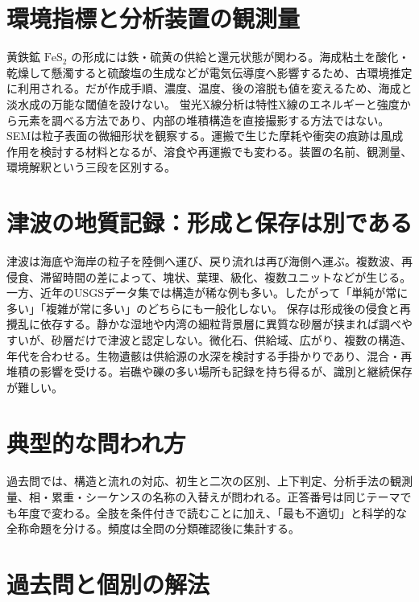 \section{環境指標と分析装置の観測量}
\label{theory:sediment:proxy}
黄鉄鉱 \(\mathrm{FeS_2}\) の形成には鉄・硫黄の供給と還元状態が関わる。海成粘土を酸化・乾燥して懸濁すると硫酸塩の生成などが電気伝導度へ影響するため、古環境推定に利用される。だが作成手順、濃度、温度、後の溶脱も値を変えるため、海成と淡水成の万能な閾値を設けない。\cite{sed_gsj_ec2011}
蛍光X線分析は特性X線のエネルギーと強度から元素を調べる方法であり、内部の堆積構造を直接撮影する方法ではない。SEMは粒子表面の微細形状を観察する。運搬で生じた摩耗や衝突の痕跡は風成作用を検討する材料となるが、溶食や再運搬でも変わる。装置の名前、観測量、環境解釈という三段を区別する。\cite{sed_xrf_jaea,sed_sem_shimane}

\section{津波の地質記録：形成と保存は別である}
\label{theory:sediment:tsunami}
津波は海底や海岸の粒子を陸側へ運び、戻り流れは再び海側へ運ぶ。複数波、再侵食、滞留時間の差によって、塊状、葉理、級化、複数ユニットなどが生じる。一方、近年のUSGSデータ集では構造が稀な例も多い。したがって「単純が常に多い」「複雑が常に多い」のどちらにも一般化しない。\cite{sed_tsunami_fujino,sed_tsunami_usgs}
保存は形成後の侵食と再攪乱に依存する。静かな湿地や内湾の細粒背景層に異質な砂層が挟まれば調べやすいが、砂層だけで津波と認定しない。微化石、供給域、広がり、複数の構造、年代を合わせる。生物遺骸は供給源の水深を検討する手掛かりであり、混合・再堆積の影響を受ける。岩礁や礫の多い場所も記録を持ち得るが、識別と継続保存が難しい。\cite{sed_tsunami_2002,sed_tsunami_gsj_survey}

\section{典型的な問われ方}
過去問では、構造と流れの対応、初生と二次の区別、上下判定、分析手法の観測量、相・累重・シーケンスの名称の入替えが問われる。正答番号は同じテーマでも年度で変わる。全肢を条件付きで読むことに加え、「最も不適切」と科学的な全称命題を分ける。頻度は全問の分類確認後に集計する。

\section{過去問と個別の解法}

